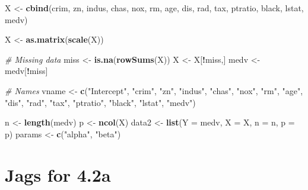 \documentclass[
]{article}
\newenvironment{Shaded}{\begin{snugshade}}{\end{snugshade}}
\newcommand{\AttributeTok}[1]{\textcolor[rgb]{0.13,0.29,0.53}{#1}}
\newcommand{\CommentTok}[1]{\textcolor[rgb]{0.56,0.35,0.01}{\textit{#1}}}
\newcommand{\FunctionTok}[1]{\textcolor[rgb]{0.13,0.29,0.53}{\textbf{#1}}}
\newcommand{\NormalTok}[1]{#1}
\newcommand{\OtherTok}[1]{\textcolor[rgb]{0.56,0.35,0.01}{#1}}
\newcommand{\SpecialCharTok}[1]{\textcolor[rgb]{0.81,0.36,0.00}{\textbf{#1}}}
\newcommand{\StringTok}[1]{\textcolor[rgb]{0.31,0.60,0.02}{#1}}
\begin{document}
\begin{Shaded}
\begin{Highlighting}[]
\NormalTok{X }\OtherTok{\textless{}{-}} \FunctionTok{cbind}\NormalTok{(crim, zn, indus,}
\NormalTok{           chas, nox, rm, age, dis, rad,}
\NormalTok{           tax, ptratio, black,}
\NormalTok{           lstat, medv)}

\NormalTok{X }\OtherTok{\textless{}{-}} \FunctionTok{as.matrix}\NormalTok{(}\FunctionTok{scale}\NormalTok{(X))}

\CommentTok{\# Missing data}
\NormalTok{miss }\OtherTok{\textless{}{-}} \FunctionTok{is.na}\NormalTok{(}\FunctionTok{rowSums}\NormalTok{(X))}
\NormalTok{X }\OtherTok{\textless{}{-}}\NormalTok{ X[}\SpecialCharTok{!}\NormalTok{miss,]}
\NormalTok{medv }\OtherTok{\textless{}{-}}\NormalTok{ medv[}\SpecialCharTok{!}\NormalTok{miss]}

\CommentTok{\# Names}
\NormalTok{vname }\OtherTok{\textless{}{-}} \FunctionTok{c}\NormalTok{(}\StringTok{"Intercept"}\NormalTok{, }\StringTok{"crim"}\NormalTok{, }\StringTok{"zn"}\NormalTok{, }\StringTok{"indus"}\NormalTok{,}
           \StringTok{"chas"}\NormalTok{, }\StringTok{"nox"}\NormalTok{, }\StringTok{"rm"}\NormalTok{, }\StringTok{"age"}\NormalTok{, }\StringTok{"dis"}\NormalTok{, }\StringTok{"rad"}\NormalTok{,}
           \StringTok{"tax"}\NormalTok{, }\StringTok{"ptratio"}\NormalTok{, }\StringTok{"black"}\NormalTok{,}
           \StringTok{"lstat"}\NormalTok{, }\StringTok{"medv"}\NormalTok{)}

\NormalTok{n }\OtherTok{\textless{}{-}} \FunctionTok{length}\NormalTok{(medv)}
\NormalTok{p }\OtherTok{\textless{}{-}} \FunctionTok{ncol}\NormalTok{(X)}
\NormalTok{data2 }\OtherTok{\textless{}{-}} \FunctionTok{list}\NormalTok{(}\AttributeTok{Y =}\NormalTok{ medv, }\AttributeTok{X =}\NormalTok{ X, }\AttributeTok{n =}\NormalTok{ n, }\AttributeTok{p =}\NormalTok{ p)}
\NormalTok{params }\OtherTok{\textless{}{-}} \FunctionTok{c}\NormalTok{(}\StringTok{"alpha"}\NormalTok{, }\StringTok{"beta"}\NormalTok{)}
\end{Highlighting}
\end{Shaded}

\section{Jags for 4.2a}\label{jags-for-4.2a}
\end{document}
